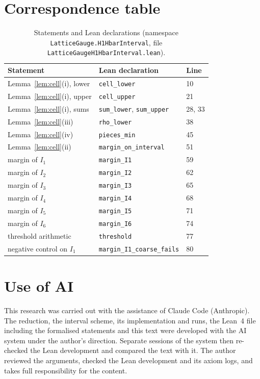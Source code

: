 \documentclass[11pt,a4paper]{article}
\theoremstyle{definition}
\theoremstyle{remark}
\begin{document}
\section{Correspondence table}\label{sec:corr}

\begin{table}[!htbp]\centering\small
\caption{Statements and Lean declarations (namespace \texttt{LatticeGauge.H1HbarInterval}, file \texttt{LatticeGaugeH1HbarInterval.lean}).}\label{tab:corr}
\begin{tabular}{@{}lll@{}}\toprule
Statement & Lean declaration & Line\\\midrule
Lemma~\ref{lem:cell}(i), lower & \texttt{cell\_lower} & 10\\
Lemma~\ref{lem:cell}(i), upper & \texttt{cell\_upper} & 21\\
Lemma~\ref{lem:cell}(i), sums & \texttt{sum\_lower}, \texttt{sum\_upper} & 28, 33\\
Lemma~\ref{lem:cell}(iii) & \texttt{rho\_lower} & 38\\
Lemma~\ref{lem:cell}(iv) & \texttt{pieces\_min} & 45\\
Lemma~\ref{lem:cell}(ii) & \texttt{margin\_on\_interval} & 51\\
margin of $I_1$ & \texttt{margin\_I1} & 59\\
margin of $I_2$ & \texttt{margin\_I2} & 62\\
margin of $I_3$ & \texttt{margin\_I3} & 65\\
margin of $I_4$ & \texttt{margin\_I4} & 68\\
margin of $I_5$ & \texttt{margin\_I5} & 71\\
margin of $I_6$ & \texttt{margin\_I6} & 74\\
threshold arithmetic & \texttt{threshold} & 77\\
negative control on $I_1$ & \texttt{margin\_I1\_coarse\_fails} & 80\\\bottomrule
\end{tabular}
\end{table}

\section{Use of AI}\label{sec:ai}

This research was carried out with the assistance of Claude Code (Anthropic). The reduction, the interval scheme, its implementation and runs, the Lean~4 file including the formalised statements and this text were developed with the AI system under the author's direction. Separate sessions of the system then re-checked the Lean development and compared the text with it. The author reviewed the arguments, checked the Lean development and its axiom logs, and takes full responsibility for the content.
\end{document}
